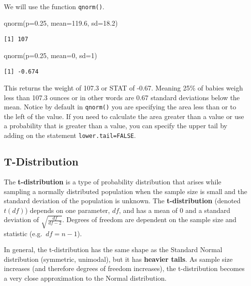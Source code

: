 \documentclass[
  letterpaper,
  DIV=11,
  numbers=noendperiod]{scrreprt}
\newenvironment{Shaded}{\begin{snugshade}}{\end{snugshade}}
\newcommand{\AttributeTok}[1]{\textcolor[rgb]{0.40,0.45,0.13}{#1}}
\newcommand{\DecValTok}[1]{\textcolor[rgb]{0.68,0.00,0.00}{#1}}
\newcommand{\FloatTok}[1]{\textcolor[rgb]{0.68,0.00,0.00}{#1}}
\newcommand{\FunctionTok}[1]{\textcolor[rgb]{0.28,0.35,0.67}{#1}}
\newcommand{\NormalTok}[1]{\textcolor[rgb]{0.00,0.23,0.31}{#1}}
\theoremstyle{definition}
\theoremstyle{remark}
\begin{document}
We will use the function \texttt{qnorm()}.

\begin{Shaded}
\begin{Highlighting}[]
\FunctionTok{qnorm}\NormalTok{(}\AttributeTok{p=}\FloatTok{0.25}\NormalTok{, }\AttributeTok{mean=}\FloatTok{119.6}\NormalTok{, }\AttributeTok{sd=}\FloatTok{18.2}\NormalTok{)}
\end{Highlighting}
\end{Shaded}

\begin{verbatim}
[1] 107
\end{verbatim}

\begin{Shaded}
\begin{Highlighting}[]
\FunctionTok{qnorm}\NormalTok{(}\AttributeTok{p=}\FloatTok{0.25}\NormalTok{, }\AttributeTok{mean=}\DecValTok{0}\NormalTok{, }\AttributeTok{sd=}\DecValTok{1}\NormalTok{)}
\end{Highlighting}
\end{Shaded}

\begin{verbatim}
[1] -0.674
\end{verbatim}

This returns the weight of 107.3 or STAT of -0.67. Meaning 25\% of
babies weigh less than 107.3 ounces or in other words are 0.67 standard
deviations below the mean. Notice by default in \texttt{qnorm()} you are
specifying the area less than or to the left of the value. If you need
to calculate the area greater than a value or use a probability that is
greater than a value, you can specify the upper tail by adding on the
statement \texttt{lower.tail=FALSE}.

\hypertarget{t-distribution}{%
\subsection{T-Distribution}\label{t-distribution}}

The \textbf{t-distribution} is a type of probability distribution that
arises while sampling a normally distributed population when the sample
size is small and the standard deviation of the population is unknown.
The \textbf{t-distribution} (denoted \(t(df)\)) depends on one
parameter, \(df\), and has a mean of 0 and a standard deviation of
\(\sqrt{\frac{df}{df-2}}\). Degrees of freedom are dependent on the
sample size and statistic (e.g.~\(df = n - 1\)).

In general, the t-distribution has the same shape as the Standard Normal
distribution (symmetric, unimodal), but it has \textbf{heavier tails}.
As sample size increases (and therefore degrees of freedom increases),
the t-distribution becomes a very close approximation to the Normal
distribution.
\end{document}
